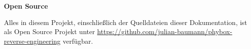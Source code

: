 \clearpage
\vspace*{\fill}
\LARGE{\textbf{Open Source}}\\[1ex]
\normalsize

Alles in diesem Projekt, einschließlich der Quelldateien dieser Dokumentation, ist als Open Source Projekt unter \url{https://github.com/julian-baumann/phybox-reverse-engineering} verfügbar.